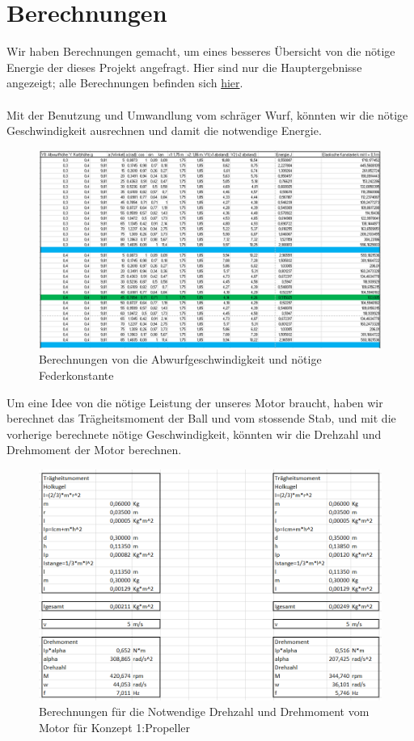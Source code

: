 \section{Berechnungen}
Wir haben Berechnungen gemacht, um eines besseres Übersicht von die nötige Energie der dieses Projekt angefragt.
Hier sind nur die Hauptergebnisse angezeigt; alle Berechnungen befinden sich \href{https://github.com/accefa/doku/tree/master/bin/Berechnungen.xlsx}{hier}. \\ \\
Mit der Benutzung und Umwandlung vom schräger Wurf, könnten wir die nötige Geschwindigkeit ausrechnen und damit die notwendige Energie.
\begin{figure}[h!]
	\centering
	\includegraphics[width=1\textwidth]{../../fig/Geschwindigkeit_und_eleastische_Konstante.png}
	\caption{Berechnungen von die Abwurfgeschwindigkeit und nötige Federkonstante}
	\label{fig:Berechnungen von die Geschwindigkeit}
\end{figure}
\newpage
Um eine Idee von die nötige Leistung der unseres Motor braucht, haben wir berechnet das Trägheitsmoment der Ball und vom stossende Stab, und mit die vorherige berechnete nötige Geschwindigkeit, könnten wir die Drehzahl und Drehmoment der Motor berechnen.
\begin{figure}[h!]
	\centering
	\includegraphics[width=1\textwidth]{../../fig/Berechnungen_Propeller.png}
	\caption{Berechnungen für die Notwendige Drehzahl und Drehmoment vom Motor für Konzept 1:Propeller}
	\label{fig:Berechnungen für der Propellerkonzept}
\end{figure}
